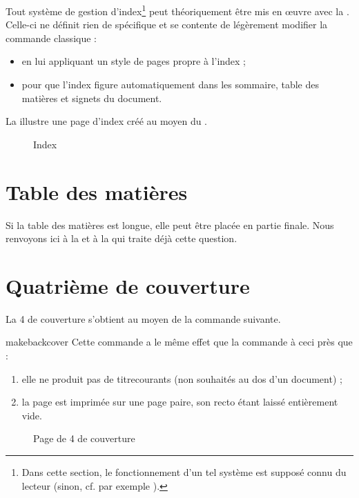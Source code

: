 Tout système de gestion d'index\footnote{Dans cette section, le fonctionnement
  d'un tel système est supposé connu du lecteur (sinon, cf. par exemple
  \cite{en-ligne7}).} peut théoriquement être mis en œuvre avec la
\yatCl{}. Celle-ci ne définit rien de spécifique et se contente de légèrement
modifier la commande  classique :
\begin{itemize}
\item en lui appliquant un style de pages propre à l'index ;
\item pour que l'index figure automatiquement dans les
  sommaire, table des matières et signets du document.
\end{itemize}

La  illustre une page d'index créé au moyen du
.

\begin{figure}[htbp]
  \centering
  \caption{Index}
  \label{fig-printindex}
\end{figure}

\section{Table des matières}
%

Si la table des matières est longue, elle peut être placée en partie
finale. Nous renvoyons ici à la  et à la
 qui traite déjà cette question.

\section{Quatrième de couverture}\label{sec-quatr-de-couv}
%
%

La 4\ieme{} de couverture s'obtient au moyen de la commande
 suivante.

\begin{docCommand}{makebackcover}{}
  Cette commande a le même effet que la commande 
  à ceci près que :
  \begin{enumerate}
  \item elle ne produit pas de \glspl{titrecourant} (non souhaités au dos d'un
    document) ;
  \item la page est imprimée sur une page paire, son recto étant
    laissé entièrement vide.
  \end{enumerate}
\end{docCommand}

\begin{figure}[htbp]
  \centering
  \caption{Page de 4\ieme{} de couverture}
  \label{fig-makebackcover}
\end{figure}

